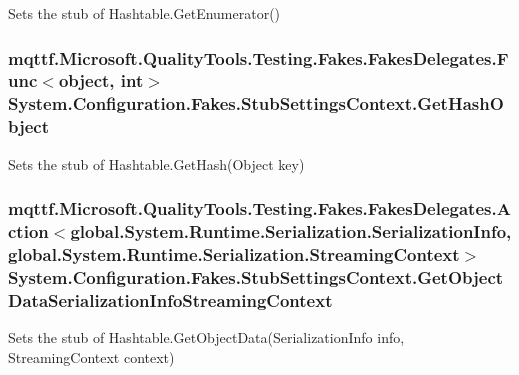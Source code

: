 Sets the stub of Hashtable.\-Get\-Enumerator()

\hypertarget{class_system_1_1_configuration_1_1_fakes_1_1_stub_settings_context_a00b2e310bf3b2d42503b1e2221589a91}{
\subsubsection[{Get\-Hash\-Object}]{\setlength{\rightskip}{0pt plus 5cm}mqttf.\-Microsoft.\-Quality\-Tools.\-Testing.\-Fakes.\-Fakes\-Delegates.\-Func$<$object, int$>$ System.\-Configuration.\-Fakes.\-Stub\-Settings\-Context.\-Get\-Hash\-Object}}\label{class_system_1_1_configuration_1_1_fakes_1_1_stub_settings_context_a00b2e310bf3b2d42503b1e2221589a91}


Sets the stub of Hashtable.\-Get\-Hash(\-Object key)

\hypertarget{class_system_1_1_configuration_1_1_fakes_1_1_stub_settings_context_a31f852bd5510c6deba8d295b6c4532bf}{
\subsubsection[{Get\-Object\-Data\-Serialization\-Info\-Streaming\-Context}]{\setlength{\rightskip}{0pt plus 5cm}mqttf.\-Microsoft.\-Quality\-Tools.\-Testing.\-Fakes.\-Fakes\-Delegates.\-Action$<$global.\-System.\-Runtime.\-Serialization.\-Serialization\-Info, global.\-System.\-Runtime.\-Serialization.\-Streaming\-Context$>$ System.\-Configuration.\-Fakes.\-Stub\-Settings\-Context.\-Get\-Object\-Data\-Serialization\-Info\-Streaming\-Context}}\label{class_system_1_1_configuration_1_1_fakes_1_1_stub_settings_context_a31f852bd5510c6deba8d295b6c4532bf}


Sets the stub of Hashtable.\-Get\-Object\-Data(\-Serialization\-Info info, Streaming\-Context context)

